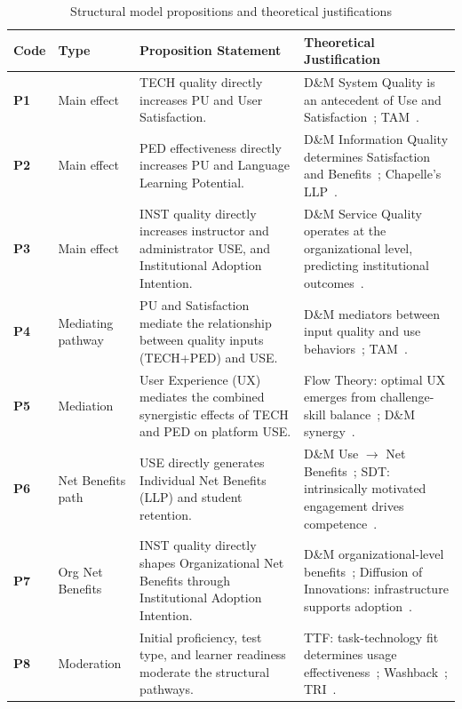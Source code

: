 \documentclass[11pt,a4paper]{article}
\begin{document}
\begin{table}[t]
  \caption{Structural model propositions and theoretical justifications}
  \label{tab:propositions}
  \centering
  \renewcommand{\arraystretch}{1.3}
  \begin{tabular}{@{} L{1.0cm} L{2.2cm} L{5.4cm} L{5.0cm} @{} }
    \toprule
    \textbf{Code} & \textbf{Type} & \textbf{Proposition Statement} & \textbf{Theoretical Justification} \\
    \midrule
    \textbf{P1} & Main effect & TECH quality directly increases PU and User Satisfaction. & D\&M System Quality is an antecedent of Use and Satisfaction~\cite{b31}\cite{b32}; TAM~\cite{b11}. \\
    \textbf{P2} & Main effect & PED effectiveness directly increases PU and Language Learning Potential. & D\&M Information Quality determines Satisfaction and Benefits~\cite{b31}; Chapelle's LLP~\cite{b1}. \\
    \textbf{P3} & Main effect & INST quality directly increases instructor and administrator USE, and Institutional Adoption Intention. & D\&M Service Quality operates at the organizational level, predicting institutional outcomes~\cite{b31}\cite{b32}. \\
    \textbf{P4} & Mediating pathway & PU and Satisfaction mediate the relationship between quality inputs (TECH+PED) and USE. & D\&M mediators between input quality and use behaviors~\cite{b31}; TAM~\cite{b11}. \\
    \textbf{P5} & Mediation & User Experience (UX) mediates the combined synergistic effects of TECH and PED on platform USE. & Flow Theory: optimal UX emerges from challenge-skill balance~\cite{b24}; D\&M synergy~\cite{b31}. \\
    \textbf{P6} & Net Benefits path & USE directly generates Individual Net Benefits (LLP) and student retention. & D\&M Use $\to$ Net Benefits~\cite{b31}; SDT: intrinsically motivated engagement drives competence~\cite{b12}. \\
    \textbf{P7} & Org Net Benefits & INST quality directly shapes Organizational Net Benefits through Institutional Adoption Intention. & D\&M organizational-level benefits~\cite{b31}; Diffusion of Innovations: infrastructure supports adoption~\cite{b29}. \\
    \textbf{P8} & Moderation & Initial proficiency, test type, and learner readiness moderate the structural pathways. & TTF: task-technology fit determines usage effectiveness~\cite{b30}; Washback~\cite{b21}; TRI~\cite{b33}. \\
    \bottomrule
  \end{tabular}
\end{table}
\end{document}
